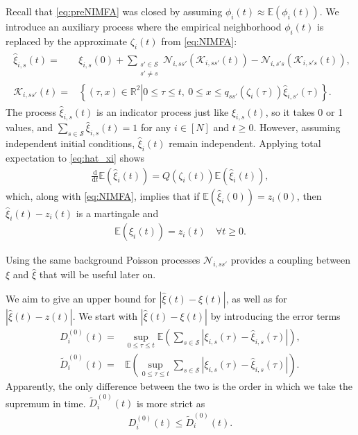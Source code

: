 \documentclass{article}
\newcommand{\E}{\mathbb{E}}
\renewcommand{\d}{\mathrm{d}}
\newcommand{\1}[1]{{\mathds{1}}_{\left\{#1\right\}}}
\newcommand{\K}{\mathcal{K}}
\newcommand{\N}{\mathcal{N}}
\renewcommand{\S}{\mathcal{S}}
\begin{document}
	
	Recall that \eqref{eq:preNIMFA} was closed by assuming $\phi_{i}(t)\approx \E \left( \phi_{i}(t)\right)$. We introduce an auxiliary process where the empirical neighborhood $\phi_{i}(t)$ is replaced by the approximate $\zeta_i(t)$ from \eqref{eq:NIMFA}:
	\begin{align} 
		\label{eq:hat_xi}
		\begin{split}
			\hat{\xi}_{i,s}(t)=&\xi_{i,s}(0)+\sum_{\substack{s' \in \S \\ s' \neq s}} \N_{i,ss'} \left(\K_{i,ss'}(t) \right)-\N_{i,s's} \left(\K_{i,s's}(t) \right),\\
			\K_{i,ss'}(t)=& \left\{(\tau,x) \in \mathbb{R}^2 \left. \right| 0 \leq \tau \leq t, \ 0 \leq x \leq q_{ss'} \left(\zeta_{i}(\tau) \right)  \hat{\xi}_{i,s'}(\tau)\right\}.
		\end{split}
	\end{align}
	The process $\hat{\xi}_{i,s}(t)$ is an indicator process just like $\xi_{i,s}(t)$, so it takes 0 or 1 values, and $\sum_{s\in\S}\hat{\xi}_{i,s}(t)=1$ for any $i\in [N]$ and $t\geq 0$. However, assuming independent initial conditions, $\hat{\xi}_{i}(t)$ remain independent. Applying total expectation to \eqref{eq:hat_xi} shows
	\begin{align*}
		\frac{\d}{\d t}\E \left(\hat{\xi}_{i}(t) \right)= Q \left(\zeta_{i}(t) \right) \E \left(\hat{\xi}_{i}(t) \right),
	\end{align*}
	which, along with \eqref{eq:NIMFA}, implies that if $\E \left(\hat{\xi}_{i}(0) \right)=z_{i}(0)$, then $\hat{\xi}_{i}(t)-z_i(t)$ is a martingale and
	\begin{align}
		\label{NIMFA_initial_condition}
		\E \left(\hat{\xi}_{i}(t) \right)=z_{i}(t) \quad  \forall t \geq 0.
	\end{align}
	
	
	Using the same background Poisson processes $ \N_{i,ss'}$ provides a coupling between $\xi$ and $\hat\xi$ that will be useful later on.
	
	
	We aim to give an upper bound for $|\hat{\xi}(t)-\xi(t)|$, as well as for $|\hat{\xi}(t)-z(t)|$. We start with $|\hat{\xi}(t)-\xi(t)|$ by introducing the error terms
	\begin{align*}
		D_{i}^{(0)}(t)=& \sup_{0 \leq \tau \leq t} \E \left(\sum_{s \in \S} \left|\xi_{i,s}(\tau)-\hat{\xi}_{i,s}(\tau) \right| \right), \\
		\tilde{D}_{i}^{(0)}(t)=&  \E \left(\sup_{0 \leq \tau \leq t}\sum_{s \in \S} \left|\xi_{i,s}(\tau)-\hat{\xi}_{i,s}(\tau) \right| \right).
	\end{align*}
	Apparently, the only difference between the two is the order in which we take the supremum in time. $\tilde{D}_{i}^{(0)}(t)$ is more strict as
	\begin{align*}
		D_{i}^{(0)}(t) \leq \tilde{D}_{i}^{(0)}(t).
	\end{align*}
	
\end{document}
